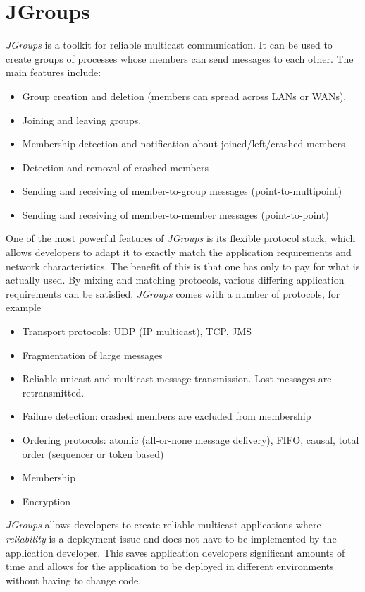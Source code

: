 \section{JGroups}
\label{sect:jgroups}

\emph{JGroups} is a toolkit for reliable multicast communication. It can be used to create groups of processes whose members can send messages to each other. The main features include:

\begin{itemize}
 \item Group creation and deletion (members can spread across LANs or WANs).
 \item Joining and leaving groups.
 \item Membership detection and notification about joined/left/crashed members
 \item Detection and removal of crashed members
 \item Sending and receiving of member-to-group messages (point-to-multipoint)
 \item Sending and receiving of member-to-member messages (point-to-point)
\end{itemize}

One of the most powerful features of \emph{JGroups} is its flexible protocol stack, which allows developers to adapt it to exactly match the application requirements and network characteristics. The benefit of this is that one has only to pay for what is actually used. By mixing and matching protocols, various differing application requirements can be satisfied. \emph{JGroups} comes with a number of protocols, for example

\begin{itemize}
 \item Transport protocols: UDP (IP multicast), TCP, JMS
 \item Fragmentation of large messages
 \item Reliable unicast and multicast message transmission. Lost messages are
       retransmitted.
 \item Failure detection: crashed members are excluded from membership
 \item Ordering protocols: atomic (all-or-none message delivery), FIFO, causal,
       total order (sequencer or token based)
 \item Membership
 \item Encryption
\end{itemize}

\emph{JGroups} allows developers to create reliable multicast applications where
\emph{reliability} is a deployment issue and does not have to be implemented by the application developer. This saves application developers significant amounts of time and allows for the application to be deployed in different environments without having to change code.


